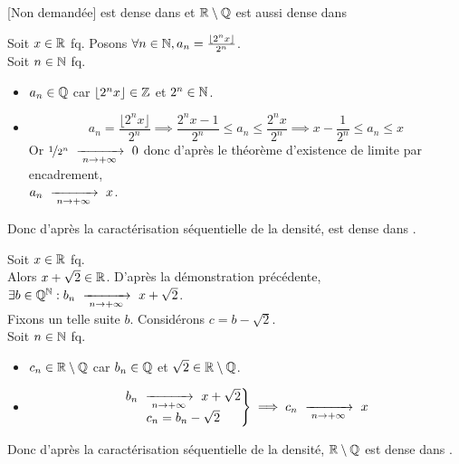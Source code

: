 \documentclass{article}
\begin{document}
\begin{question_kholle}
	{[Non demandée] \Q est dense dans \R et $\mathbb R \setminus \mathbb Q$ est aussi dense dans \R}

	Soit $x \in \mathbb R$ fq.
	Posons $\forall n \in \mathbb N, a_n = \frac{\lfloor2^n x\rfloor}{2^n}$. \\
	Soit $n \in \mathbb N$ fq. \\
	\begin{itemize}
		\item $a_n \in \mathbb Q$ car $\lfloor2^n x\rfloor \in \mathbb Z$ et $2^n \in \mathbb N$.
		\item \begin{equation*}
			      a_n = \frac{\lfloor2^n x\rfloor}{2^n}
			      \implies \frac{2^n x - 1}{2^n} \leqslant a_n \leqslant \frac{2^n x}{2^n}
			      \implies x - \frac{1}{2^n} \leqslant a_n \leqslant x
		      \end{equation*}
		      Or $\nicefrac{1}{2^n} \ \xrightarrow[\;n \to +\infty\;]{}\  0$ donc d'après le théorème d'existence de limite par encadrement, \\ $a_n \ \xrightarrow[\;n \to +\infty\;]{}\  x$.
	\end{itemize}
	Donc d'après la caractérisation séquentielle de la densité, \Q est dense dans \R.
	\bigbreak

	\noindent Soit $x \in \mathbb R$ fq. \\
	Alors $x + \sqrt{2} \in \mathbb R$.
	D'après la démonstration précédente, $\exists b \in \mathbb Q^{\mathbb N} : b_n \ \xrightarrow[\;n \to +\infty\;]{}\  x + \sqrt{2}$. \\
	Fixons un telle suite $b$.
	Considérons $c = b - \sqrt{2}$. \\
	Soit $n \in \mathbb N$ fq.
	\begin{itemize}
		\item $c_n \in \mathbb R\setminus\mathbb Q$ car $b_n \in \mathbb Q$ et $\sqrt{2} \in \mathbb R \setminus \mathbb Q$.
		\item \begin{equation*}
			      \left. \begin{matrix}
				      b_n \ \xrightarrow[\;n \to +\infty\;]{}\  x + \sqrt{2} \\
				      c_n = b_n - \sqrt{2}
			      \end{matrix} \right\}
			      \implies c_n \ \xrightarrow[\;n \to +\infty\;]{}\  x
		      \end{equation*}
	\end{itemize}
	Donc d'après la caractérisation séquentielle de la densité, $\mathbb R\setminus \mathbb Q$ est dense dans \R.
\end{question_kholle}
\end{document}
